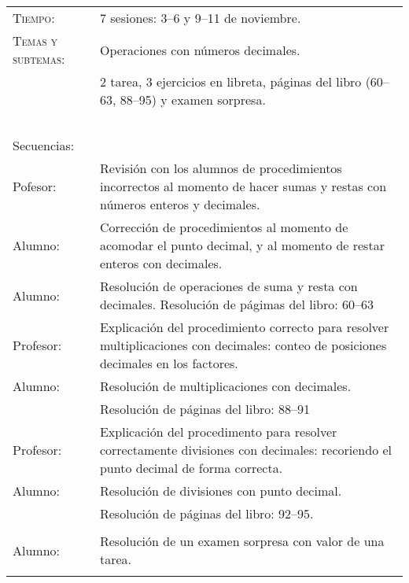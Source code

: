 \documentclass[letterpaper,10pt]{article}
\begin{document}
\begin{tabular}[t]{R{0.25\textwidth}p{0.71\textwidth}}
    \textsc{Tiempo:}                    & 7 sesiones: 3--6 y 9--11  de noviembre. \\
    \textsc{Temas y subtemas:}          & Operaciones con n\'umeros decimales.\\
              & 2 tarea, 3 ejercicios en libreta, p\'aginas del libro (60--63, 88--95) y examen sorpresa. \\ \\
    \large{\sc Secuencias:} \\
    Pofesor:    & Revisi\'on con los alumnos de procedimientos incorrectos al momento de hacer sumas y restas con n\'umeros enteros y decimales. \\
    Alumno:     & Correcci\'on de procedimientos al momento de acomodar el punto decimal, y al momento de restar enteros con decimales.\\
    Alumno:     & Resoluci\'on de operaciones de suma y resta con decimales. Resolución de p\'agimas del libro: 60--63 \\
    Profesor:   & Explicaci\'on del procedimiento correcto para resolver multiplicaciones con decimales: conteo de posiciones decimales en los factores. \\

    Alumno:     & Resoluci\'on de multiplicaciones con decimales. \\
                & Resoluci\'on de p\'aginas del libro: 88--91 \\
    Profesor:   & Explicaci\'on del procedimento para resolver correctamente divisiones con decimales: recoriendo el punto decimal de forma correcta. \\
    Alumno:     & Resoluci\'on de divisiones con punto decimal. \\ 
                & Resoluci\'on de p\'aginas del libro: 92--95. \\ \\
    Alumno:     & Resoluci\'on de un examen sorpresa con valor de una tarea.
\\ \hline \\
\end{tabular}
\end{document}
